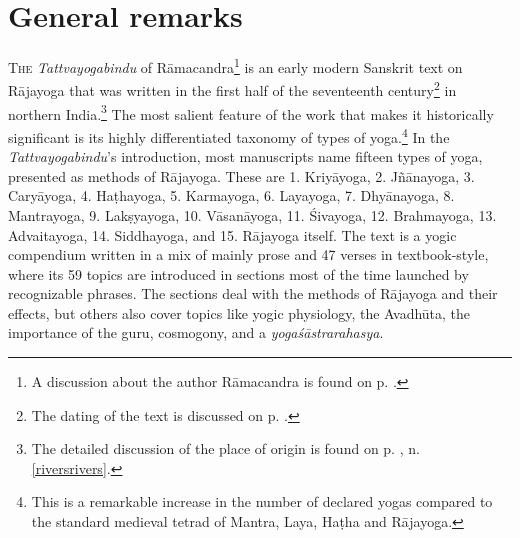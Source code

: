 \section{General remarks}
 \label{generalremarks}
 \lettrine{T}{he} \textit{Tattvayogabindu} of Rāmacandra\footnote{A discussion about the author Rāmacandra is found on p. \pageref{ramarama}.} is an early modern Sanskrit text on Rājayoga that was written in the first half of the seventeenth century\footnote{The dating of the text is discussed on p. \pageref{dating}.} in northern India.\footnote{The detailed discussion of the place of origin is found on p. \pageref{riversrivers}, n. \ref{riversrivers}.} The most salient feature of the work that makes it historically significant is its highly differentiated taxonomy of types of yoga.\footnote{This is a remarkable increase in the number of declared yogas compared to the standard medieval tetrad of Mantra, Laya, Haṭha and Rājayoga.} In the \textit{Tattvayogabindu}'s introduction, most manuscripts name fifteen types of yoga, presented as methods of Rājayoga. These are 1. Kriyāyoga, 2. Jñānayoga, 3. Caryāyoga, 4. Haṭhayoga, 5. Karmayoga, 6. Layayoga, 7. Dhyānayoga, 8. Mantrayoga, 9. Lakṣyayoga, 10. Vāsanāyoga, 11. Śivayoga, 12. Brahmayoga, 13. Advaitayoga, 14. Siddhayoga, and 15. Rājayoga itself. The text is a yogic compendium written in a mix of mainly prose and 47 verses in textbook-style, where its 59 topics are introduced in sections most of the time launched by recognizable phrases. The sections deal with the methods of Rājayoga and their effects, but others also cover topics like yogic physiology, the Avadhūta, the importance of the guru, cosmogony, and a \textit{yogaśāstrarahasya}.  

